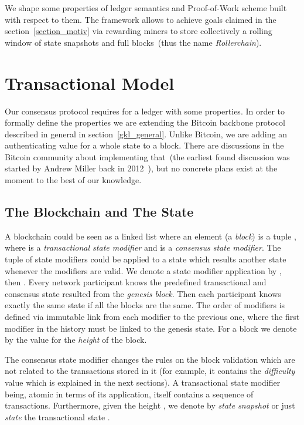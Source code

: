 \documentclass[conference,compsoc]{IEEEtran}
\begin{document}
We shape some properties of ledger semantics and Proof-of-Work scheme built with respect to them. The framework allows to achieve goals claimed in the section~\ref{section_motiv} via rewarding miners to store collectively a rolling window of state snapshots and full blocks~(thus the name \textit{Rollerchain}).



\section{Transactional Model}
\label{tx_model}

Our consensus protocol requires for a ledger with some properties. In order to formally define the properties we are extending the Bitcoin backbone protocol described in general in section~\ref{gkl_general}. Unlike Bitcoin, we are adding an authenticating value for a whole state to a block. There are discussions in the Bitcoin community about implementing that~(the earliest found discussion was started by Andrew Miller back in 2012~\cite{utxoset}), but no concrete plans exist at the moment to the best of our knowledge.

\subsection{The Blockchain and The State}

A blockchain could be seen as a linked list where an element (a \textit{block}) is a tuple , where  is a \textit{transactional state modifier} and  is a \textit{consensus state modifier}. The tuple of state modifiers could be applied to a state which results another state whenever the modifiers are valid. We denote a state modifier application by , then . Every network participant knows the predefined  transactional and consensus state  resulted from the \textit{genesis block}. Then each participant knows exactly the same state  if all the blocks are the same. The order of modifiers is defined via immutable  link from each modifier to the previous one, where the first modifier in the history must be linked to the genesis state. For a block  we denote by  the value for the \textit{height} of the block.

The consensus state modifier changes the rules on the block validation which are not related to the transactions stored in it (for example, it contains the \textit{difficulty} value  which is explained in the next sections). A transactional state modifier being, atomic in terms of its application, itself contains a sequence of transactions. Furthermore, given the height , we denote by \textit{state snapshot} or just \textit{state} the transactional state . 
\end{document}
